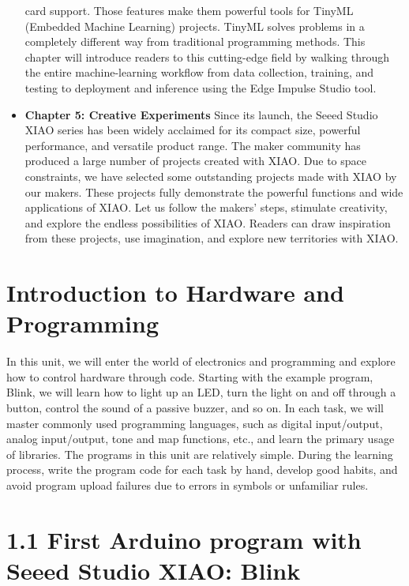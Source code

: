\documentclass[
  letterpaper,
  DIV=11,
  numbers=noendperiod]{scrreprt}
\begin{document}
\begin{itemize}
  card support. Those features make them powerful tools for TinyML
  (Embedded Machine Learning) projects. TinyML solves problems in a
  completely different way from traditional programming methods. This
  chapter will introduce readers to this cutting-edge field by walking
  through the entire machine-learning workflow from data collection,
  training, and testing to deployment and inference using the Edge
  Impulse Studio tool.
\item
  \textbf{Chapter 5: Creative Experiments} Since its launch, the Seeed
  Studio XIAO series has been widely acclaimed for its compact size,
  powerful performance, and versatile product range. The maker community
  has produced a large number of projects created with XIAO. Due to
  space constraints, we have selected some outstanding projects made
  with XIAO by our makers. These projects fully demonstrate the powerful
  functions and wide applications of XIAO. Let us follow the makers'
  steps, stimulate creativity, and explore the endless possibilities of
  XIAO. Readers can draw inspiration from these projects, use
  imagination, and explore new territories with XIAO.
\end{itemize}


\hypertarget{introduction-to-hardware-and-programming}{%
\chapter{Introduction to Hardware and
Programming}\label{introduction-to-hardware-and-programming}}

In this unit, we will enter the world of electronics and programming and
explore how to control hardware through code. Starting with the example
program, Blink, we will learn how to light up an LED, turn the light on
and off through a button, control the sound of a passive buzzer, and so
on. In each task, we will master commonly used programming languages,
such as digital input/output, analog input/output, tone and map
functions, etc., and learn the primary usage of libraries. The programs
in this unit are relatively simple. During the learning process, write
the program code for each task by hand, develop good habits, and avoid
program upload failures due to errors in symbols or unfamiliar rules.


\hypertarget{first-arduino-program-with-seeed-studio-xiao-blink}{%
\chapter*{1.1 First Arduino program with Seeed Studio XIAO:
Blink}\label{first-arduino-program-with-seeed-studio-xiao-blink}}
\end{document}
